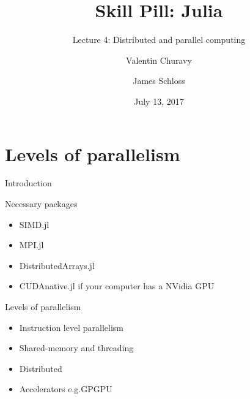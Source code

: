 \documentclass{beamer}
\title[Skill Pill]{Skill Pill: Julia} %
\subtitle{Lecture 4: Distributed and parallel computing}
\author{Valentin Churavy \and James Schloss} %
\institute[OIST] %
{
Okinawa Institute of Science and Technology \\ %
\textit{valentin.churavy@oist.jp} \\
\textit{james.schloss@oist.jp} %
}
\date{July 13, 2017} %
\begin{document}

\begin{frame}
\vspace*{1.4cm}
\titlepage %
\end{frame}



\begin{frame}
  \tableofcontents
\end{frame}

\section{Levels of parallelism}
\begin{frame}{Introduction}
  \pause
  \begin{block}{Necessary packages}
    \begin{itemize}
      \item SIMD.jl
      \item MPI.jl
      \item DistributedArrays.jl
      \item CUDAnative.jl if your computer has a NVidia GPU
    \end{itemize}
  \end{block}
\end{frame}
\begin{frame}{Levels of parallelism}
  \begin{itemize}
    \item Instruction level parallelism
    \item Shared-memory and threading
    \item Distributed
    \item Accelerators e.g.GPGPU
  \end{itemize}
\end{frame}
\end{document}
